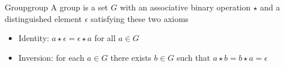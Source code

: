 \begin{definition}{Group}{group}
    A group is a set $ G$ with an associative binary operation $ \star$ and a distinguished element $ \epsilon$ satisfying these two axioms
    \begin{itemize}
        \item Identity: $ a \star \epsilon =  \epsilon \star a$ for all $ a \in G$ 
        \item Inversion: for each $ a \in G$ there exists $ b \in G$ such that $ a \star b =  b \star a =  \epsilon$ 
    \end{itemize}
\end{definition}
